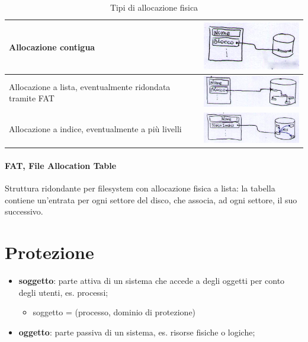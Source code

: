 \documentclass[12pt,a4paper]{article}
\begin{document}
\begin{table}[H]
\centering
\begin{tabular}{| p{8cm} | c |}\hline
  Allocazione contigua  & \includegraphics[width=5cm]{img/fs/alloc-contigua.png}  \\ \hline
  Allocazione a lista, eventualmente ridondata tramite FAT & \includegraphics[width=5cm]{img/fs/alloc-lista.png}  \\ \hline
  Allocazione a indice, eventualmente a più livelli & \includegraphics[width=5cm]{img/fs/alloc-indice.png}  \\ \hline
\end{tabular}
\caption{Tipi di allocazione fisica}
\end{table}

\paragraph{FAT, File Allocation Table}
Struttura ridondante per filesystem con allocazione fisica a lista:
la tabella contiene un'entrata per ogni settore del disco, che associa,
ad ogni settore, il suo successivo.

\section{Protezione}
\begin{itemize}
  \item \textbf{soggetto}: parte attiva di un sistema che accede a degli
    oggetti per conto degli utenti, es. processi;
  \begin{itemize}
    \item soggetto = (processo, dominio di protezione)
  \end{itemize}
  \item \textbf{oggetto}: parte passiva di un sistema, es. risorse
    fisiche o logiche;
\end{itemize}
\end{document}
